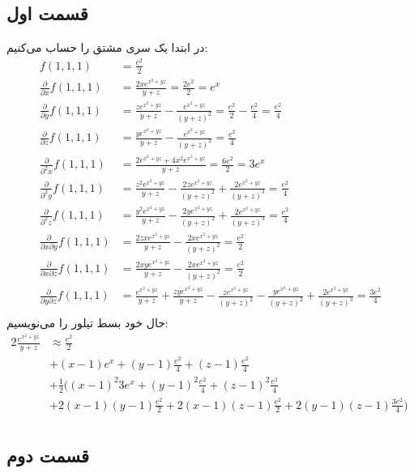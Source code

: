\documentclass[]{article}
\begin{document}
\subsection*{قسمت اول}
در ابتدا یک سری مشتق را حساب می‌کنیم:
\begin{align*}
    f(1,1,1) &= \frac{e^{2}}{2}\\
    \frac{\partial}{\partial x} f(1,1,1) &= \frac{2xe^{x^2+yz}}{y + z} = \frac{2e^{2}}{2} = e^x\\
    \frac{\partial}{\partial y} f(1,1,1) &= \frac{ze^{x^2+yz}}{y + z} - \frac{e^{x^2+yz}}{(y + z)^2} = \frac{e^{2}}{2} - \frac{e^{2}}{4} = \frac{e^{2}}{4}\\
    \frac{\partial}{\partial z} f(1,1,1) &= \frac{ye^{x^2+yz}}{y + z} - \frac{e^{x^2+yz}}{(y + z)^2} = \frac{e^{2}}{4}\\
    \frac{\partial}{\partial^2 x} f(1,1,1) &= \frac{2e^{x^2+yz}+4x^2e^{x^2+yz}}{y + z} = \frac{6e^2}{2} = 3e^x\\
    \frac{\partial}{\partial^2 y} f(1,1,1) &= \frac{z^{2} e^{x^{2}+y z}}{y +z}-\frac{2 z e^{x^{2}+y z}}{\left(y +z \right)^{2}}+\frac{2 e^{x^{2}+y z}}{\left(y +z \right)^{3}} = \frac{e^{2}}{4}\\
    \frac{\partial}{\partial^2 z} f(1,1,1) &= \frac{y^{2} e^{x^{2}+y z}}{y +z}-\frac{2 y e^{x^{2}+y z}}{\left(y +z \right)^{2}}+\frac{2 e^{x^{2}+y z}}{\left(y +z \right)^{3}} = \frac{e^{2}}{4}\\
    \frac{\partial}{\partial x \partial y} f(1,1,1) &= \frac{2 z x e^{x^{2}+y z}}{y +z}-\frac{2 x e^{x^{2}+y z}}{\left(y +z \right)^{2}} = \frac{e^{2}}{2}\\
    \frac{\partial}{\partial x \partial z} f(1,1,1) &= \frac{2 x y e^{x^{2}+y z}}{y +z}-\frac{2 x e^{x^{2}+y z}}{\left(y +z \right)^{2}} = \frac{e^{2}}{2}\\
    \frac{\partial}{\partial y \partial z} f(1,1,1) &= \frac{e^{x^{2}+y z}}{y +z}+\frac{z y e^{x^{2}+y z}}{y +z}-\frac{z e^{x^{2}+y z}}{\left(y +z \right)^{2}}-\frac{y e^{x^{2}+y z}}{\left(y +z \right)^{2}}+\frac{2 e^{x^{2}+y z}}{\left(y +z \right)^{3}} = \frac{3e^{2}}{4}\\
\end{align*}
حال خود بسط تیلور را می‌نویسیم:
\begin{align*}{2}
    \frac{e^{x^2+yz}}{y + z} &\approx \frac{e^{2}}{2} &&\\
    &+ (x - 1) e^x + (y - 1) \frac{e^{2}}{4} + (z - 1) \frac{e^{2}}{4}&&\\
    &+ \frac{1}{2} \biggl(\left(x - 1\right)^2 3e^x + \left(y - 1\right)^2 \frac{e^{2}}{4} + \left(z - 1\right)^2 \frac{e^{2}}{4} \\
    &+ 2\left(x - 1\right)\left(y - 1\right) \frac{e^{2}}{2} + 2\left(x - 1\right)\left(z - 1\right) \frac{e^{2}}{2} + 2\left(y - 1\right)\left(z - 1\right) \frac{3e^{2}}{4}\biggr)\\
\end{align*}
\subsection*{قسمت دوم}
\end{document}
